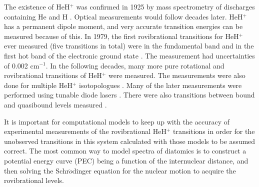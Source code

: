 \documentclass[aps,onecolumn]{revtex4}
\begin{document}
The existence of HeH$^+$ was confirmed in 1925 by mass spectrometry of discharges
containing He and H \cite{exp3}. Optical measurements would follow decades later.
HeH$^+$ has a permanent dipole moment, and very
accurate transition energies can be measured because of this. In 1979, the first rovibrational
transitions for HeH$^+$  ever measured (five transitions in total) were in the fundamental
band and in the first hot band of the electronic ground state \cite{exp2}. The
measurement had uncertainties
of 0.002 cm$^{-1}$. In the following decades, many more pure rotational \cite{exp1, exp7, exp9}
and rovibrational \cite{exp4, exp5, exp6, exp8, exp9, exp10} transitions of
HeH$^+$ were measured. The measurements were also done for
multiple HeH$^+$ isotopologues \cite{exp1, exp4, exp10}. Many of the later measurements were performed
using tunable diode lasers \cite{exp7, exp8, exp10}. There were also transitions between bound
and quasibound levels measured \cite{exp5}.


It is important for computational models to keep up with the accuracy of experimental
measurements of the rovibrational HeH$^+$ transitions 
in order for the unobserved transitions in this system calculated with
those models to be assumed correct. The most common way to model spectra of diatomics is to construct
a potential energy curve (PEC) being a function of the internuclear distance, and then solving the
Schr$\ddot{o}$dinger equation for the nuclear motion to acquire the rovibrational levels.
\end{document}
